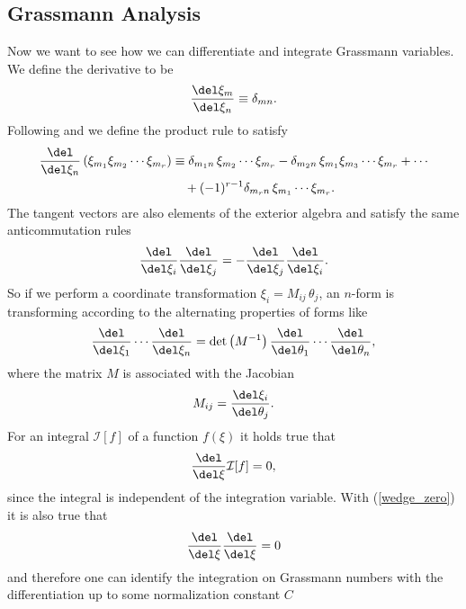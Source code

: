 \subsection{Grassmann Analysis} \label{sec: grassmann_analysis}
Now we want to see how we can differentiate and integrate Grassmann variables. We define the derivative to be
\begin{equation}
\dfrac{\del \xi_{m}}{\del\xi_{n}}\equiv\delta_{m n} .
\end{equation}
Following \cite{Cartier:2002zp} and \cite{Berezin} we define the product rule to satisfy
\begin{align}
\dfrac{\del }{\del\xi_{n}} \left(\xi_{m_{1}}\xi_{m_{2}}\cdots \xi_{m_{r}}\right) &\equiv \delta_{m_{1} n}\,\xi_{m_{2}}\cdots\xi_{m_{r}}-\delta_{m_{2} n}\,\xi_{m_{1}} \xi_{m_{3}}\cdots \xi_{m_{r}} +\cdots  \notag \\
&\quad + (-1)^{r-1} \delta_{m_{r} n}\,\xi_{m_{1}}\cdots \xi_{m_{r}}.
\end{align}
The tangent vectors are also elements of the exterior algebra and satisfy the same anticommutation rules
\begin{equation}
\frac{\del }{\del \xi_{i}} \frac{\del }{\del\xi_{j}} = - \frac{\del }{\del \xi_{j}} \frac{\del }{\del\xi_{i}}.
\end{equation}
%
%
So if we perform a coordinate transformation $\xi_{i}=M_{ij}\,\theta_{j}$, an $n$-form is transforming according to the alternating properties of forms like
\begin{equation}
\frac{\del }{\del \xi_{1}}\cdots\frac{\del }{\del \xi_{n}} = \mathrm{det}\left(M^{-1}\right) \frac{\del }{\del \theta_{1}}\cdots \frac{\del }{\del \theta_{n}},
\label{coord_trafo}
\end{equation}
where the matrix $M$ is associated with the Jacobian
\begin{equation}
M_{ij}=\frac{\del \xi_{i}}{\del\theta_{j}}.
\end{equation}
For an integral $\mathcal{I}[f]$ of a function $f(\xi)$ it holds true that
\begin{equation}
\dfrac{\del}{\del \xi}\mathcal{I}[f] =0,
\end{equation}
since the integral is independent of the integration variable. With (\ref{wedge_zero}) it is also true that
\begin{equation}
\dfrac{\del}{\del \xi}\dfrac{\del}{\del \xi}=0
\end{equation}
and therefore one can identify the integration on Grassmann numbers with the differentiation up to some normalization constant $C$
